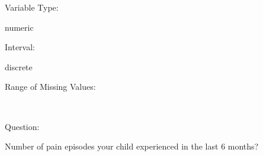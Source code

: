 \documentclass[
]{article}
\begin{document}
\begin{minipage}[t]{0.3\linewidth}

\colorbox{mypink1}{}

\end{minipage}%
\begin{minipage}[t]{0.7\linewidth}

\colorbox{mypink1}{\makebox[\textwidth]{\strut\bfseries\color{black}  
 }}

\end{minipage}

\begin{minipage}[t]{0.3\linewidth}

Variable Type:

\end{minipage}%
\begin{minipage}[t]{0.7\linewidth}

numeric

\end{minipage}

\begin{minipage}[t]{0.3\linewidth}

Interval:

\end{minipage}%
\begin{minipage}[t]{0.7\linewidth}

discrete

\end{minipage}

\begin{minipage}[t]{0.3\linewidth}

Range of Missing Values:

\end{minipage}%
\begin{minipage}[t]{0.7\linewidth}

~

\end{minipage}

\begin{minipage}[t]{0.3\linewidth}

Question:

\end{minipage}%
\begin{minipage}[t]{0.7\linewidth}

Number of pain episodes your child experienced in the last 6 months?

\end{minipage}
\end{document}
